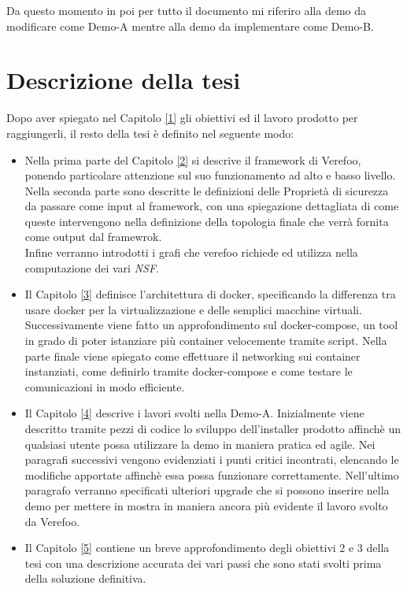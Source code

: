 Da questo momento in poi per tutto il documento mi riferiro alla demo da modificare come Demo-A mentre alla demo da implementare come Demo-B.

\section{Descrizione della tesi}

Dopo aver spiegato nel Capitolo \hyperref[ch:intro]{[1]} gli obiettivi ed il lavoro prodotto per raggiungerli, il resto della
tesi è definito nel seguente modo:

\begin{itemize}
    \item Nella prima parte del Capitolo \hyperref[ch:intro]{[2]} si descrive il framework di Verefoo, ponendo particolare attenzione sul suo funzionamento ad alto e basso livello.
        Nella seconda parte sono descritte  le  definizioni delle Proprietà di sicurezza da passare come input al framework, con una spiegazione dettagliata
        di come queste intervengono nella definizione della topologia finale che verrà fornita come output dal framewrok. \\
        Infine verranno introdotti i grafi che verefoo richiede ed utilizza nella computazione dei vari \textit{NSF}.
    \item Il Capitolo \hyperref[ch:intro]{[3]} definisce l'architettura di docker, specificando la differenza tra usare docker per la virtualizzazione e delle semplici macchine virtuali. Successivamente
          viene fatto un approfondimento sul docker-compose, un tool in grado di poter istanziare più container velocemente tramite script. Nella parte finale viene spiegato come effettuare il networking
          sui container instanziati, come definirlo tramite docker-compose e come testare le comunicazioni in modo efficiente.
    \item Il Capitolo \hyperref[ch:intro]{[4]} descrive i lavori svolti nella Demo-A. Inizialmente viene descritto tramite pezzi di codice lo sviluppo dell'installer prodotto affinchè un qualsiasi utente possa
          utilizzare la demo in maniera pratica ed agile. Nei paragrafi successivi vengono evidenziati i punti critici incontrati, elencando le modifiche apportate affinchè essa possa funzionare correttamente.
          Nell'ultimo paragrafo verranno specificati ulteriori upgrade che si possono inserire nella demo per mettere in mostra in maniera ancora più evidente il lavoro svolto da Verefoo.
    \item Il Capitolo \hyperref[ch:intro]{[5]} contiene un breve approfondimento degli obiettivi 2 e 3 della tesi con una descrizione accurata dei vari passi che sono stati svolti prima della soluzione definitiva.

\end{itemize}
